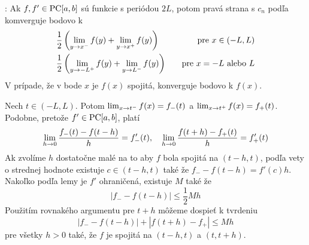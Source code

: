 \begin{veta}
    :
    Ak $f, f' \in \mbox{PC}[a,b]$ sú funkcie s periódou $2L$, potom 
    pravá strana \todo{} s $c_n$ podľa \todo{} komverguje
    bodovo k
    \begin{align}
        &\frac{1}{2}\left( \lim_{y\rightarrow x^-} f(y) +
                \lim_{y\rightarrow x^+} f(y)\right) \quad &\mbox{pre\ }
                x\in(-L,L) \\
        &\frac{1}{2}\left( \lim_{y\rightarrow -L^+} f(y) +
                \lim_{y\rightarrow L^-} f(y)\right) \quad &\mbox{pre\ }
                x=-L \mbox{\ alebo\ } L            
    \end{align}
    V prípade, že v bode $x$ je $f(x)$ spojitá, \todo{} konverguje
    bodovo k $f(x)$.
\end{veta}
\begin{dokaz}
    Nech $t \in (-L,L)$. Potom
    $\lim_{x\rightarrow t^-} f(x) = f_-(t)$ a 
    $\lim_{x\rightarrow t^+} f(x) = f_+(t)$.
    Podobne, pretože $f' \in \mbox{PC}[a,b]$, platí
    \begin{equation}
        \lim_{h\rightarrow 0} \frac{f_-(t) - f(t-h)}{h} = f'_-(t), \quad
        \lim_{h\rightarrow 0} \frac{f(t+h)-f_+(t)}{h} = f'_+(t)
    \end{equation}
    Ak zvolíme $h$ dostatočne malé na to aby $f$ bola spojitá na
    $(t-h,t)$, podľa vety o strednej hodnote
    existuje $c \in (t-h,t)$ také že 
    $f_- - f(t-h) = f'(c) h$.
    Nakoľko podľa lemy  je $f'$ ohraničená,
    existuje $M$ také že
    \begin{equation}
        |f_- - f(t-h)| \le \frac{1}{2} M h
    \end{equation}
    Použitím rovnakého argumentu pre $t+h$ môžeme dospieť k tvrdeniu
    \begin{equation}
        |f_- - f(t-h)| + |f(t+h) - f_+| \le Mh
        \label{eq:ft_ohranicenie}
    \end{equation}
    pre všetky $h>0$ také, že $f$ je spojitá na $(t-h,t)$ a $(t,t+h)$.


\end{dokaz}
